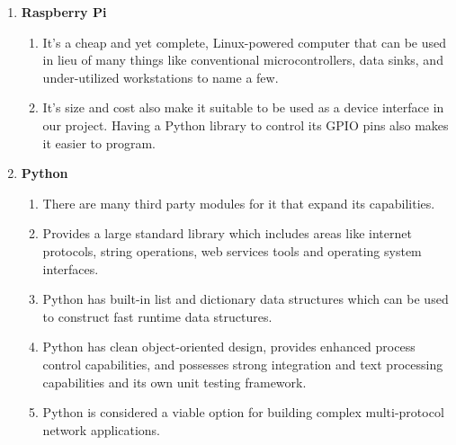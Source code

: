 \begin{enumerate}

\begin{comment}
\item \textbf{Machine Learning}
It is central to the functioning of any system that is based on learning complex models that often change dynamically, thus rendering hard coding of such models difficult if not impossible. Machine learning overcomes this hurdle by analyzing the model and trying to detect any patterns in it. Any changes in the pattern can also be detected by the system and the system can respond to it suitably.
\end{comment}

\item \textbf{Raspberry Pi}
	\begin{enumerate}
	\item[] It's a cheap and yet complete, Linux-powered computer that can be used in lieu of many things like conventional microcontrollers, data sinks, and under-utilized workstations to name a few.
	\item[] It's size and cost also make it suitable to be used as a device interface in our project. Having a Python library to control its GPIO pins also makes it easier to program.
	\end{enumerate}

\item \textbf{Python}
	\begin{enumerate}
	\item[] There are many third party modules for it that expand its capabilities.
	\item[] Provides a large standard library which includes areas like internet protocols, string operations, web services tools and operating system interfaces.
	\item[] Python has built-in list and dictionary data structures which can be used to construct fast runtime data structures.
	\item[] Python has clean object-oriented design, provides enhanced process control capabilities, and possesses strong integration and text processing capabilities and its own unit testing framework.
	\item[] Python is considered a viable option for building complex multi-protocol network applications.
	\end{enumerate}


\end{enumerate}
